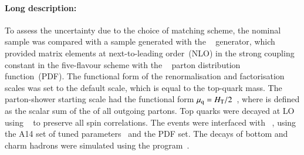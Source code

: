 \paragraph{Long description:}

To assess the uncertainty due to the choice of matching scheme, the nominal sample was compared with a sample generated
with the \MGNLO[2.6.2]~\cite{Alwall:2014hca} generator, which provided matrix elements at next-to-leading order~(NLO) in the strong coupling constant \alphas
in the five-flavour scheme with the \NNPDF[3.0nlo]~\cite{Ball:2014uwa} parton distribution function~(PDF).
The functional form of the renormalisation and factorisation scales was set to the default scale, which is equal to the top-quark mass.
The parton-shower starting scale had the functional form \(\mu_\mathrm{q} = H_{\text{T}}/2\)~\cite{ATL-PHYS-PUB-2017-007},
where \HT is defined as the scalar sum of the \pT of all outgoing partons.
Top quarks were decayed at LO using \MADSPIN~\cite{Frixione:2007zp,Artoisenet:2012st} to preserve all spin correlations.
The events were interfaced with \PYTHIA[8.230]~\cite{Sjostrand:2014zea}, using the A14 set of tuned parameters~\cite{ATL-PHYS-PUB-2014-021}
and the \NNPDF[2.3lo] PDF set.
The decays of bottom and charm hadrons were simulated using the \EVTGEN[1.6.0] program~\cite{Lange:2001uf}.

